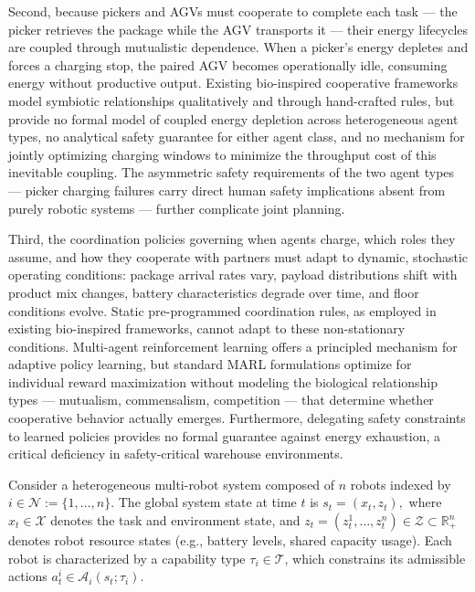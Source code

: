 \documentclass[Afour,sageh,times]{sagej}
\begin{document}
Second, because pickers and AGVs must cooperate to complete each task — the picker retrieves the package while the AGV transports it — their energy lifecycles are coupled through mutualistic dependence. When a picker's energy depletes and forces a charging stop, the paired AGV becomes operationally idle, consuming energy without productive output. Existing bio-inspired cooperative frameworks model symbiotic relationships qualitatively and through hand-crafted rules, but provide no formal model of coupled energy depletion across heterogeneous agent types, no analytical safety guarantee for either agent class, and no mechanism for jointly optimizing charging windows to minimize the throughput cost of this inevitable coupling. The asymmetric safety requirements of the two agent types — picker charging failures carry direct human safety implications absent from purely robotic systems — further complicate joint planning.

Third, the coordination policies governing when agents charge, which roles they assume, and how they cooperate with partners must adapt to dynamic, stochastic operating conditions: package arrival rates vary, payload distributions shift with product mix changes, battery characteristics degrade over time, and floor conditions evolve. Static pre-programmed coordination rules, as employed in existing bio-inspired frameworks, cannot adapt to these non-stationary conditions. Multi-agent reinforcement learning offers a principled mechanism for adaptive policy learning, but standard MARL formulations optimize for individual reward maximization without modeling the biological relationship types — mutualism, commensalism, competition — that determine whether cooperative behavior actually emerges. Furthermore, delegating safety constraints to learned policies provides no formal guarantee against energy exhaustion, a critical deficiency in safety-critical warehouse environments.

Consider a heterogeneous multi-robot system composed of $n$ robots indexed by $i \in \mathcal{N} := \{1,\dots,n\}$. The global system state at time $t$ is $s_t = (x_t, z_t),$ where $x_t \in \mathcal{X}$ denotes the task and environment state, and $z_t = (z_t^1,\dots,z_t^n) \in \mathcal{Z} \subset \mathbb{R}_+^n$ denotes robot resource states (e.g., battery levels, shared capacity usage). Each robot is characterized by a capability type $\tau_i \in \mathcal{T}$, which constrains its admissible actions $a_t^i \in \mathcal{A}_i(s_t;\tau_i)$.
\end{document}
